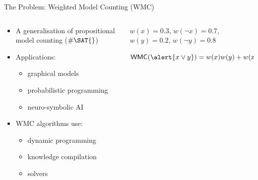 \documentclass{beamer}
\begin{document}
\begin{frame}{The Problem: Weighted Model Counting (WMC)}
  \begin{columns}
    \begin{column}{0.5\textwidth}
      \begin{itemize}
        \item A generalisation of propositional model counting ($\#\SAT{}$)
        \item Applications:
        \begin{itemize}
          \item graphical models
          \item probabilistic programming
          \item neuro-symbolic AI
        \end{itemize}
        \item WMC algorithms use:
        \begin{itemize}
          \item dynamic programming
          \item knowledge compilation
          \item \SAT{} solvers
        \end{itemize}
      \end{itemize}
    \end{column}
    \begin{column}{0.5\textwidth}
      \begin{example}
        $w(x) = 0.3$, $w(\neg x) = 0.7$, $w(y) = 0.2$, $w(\neg y) = 0.8$
        \vspace{0.5cm}

        $\mathsf{WMC}(\alert{x \lor y}) = w(x)w(y) + w(x)w(\neg y) + w(\neg x)w(y) = 0.44$
      \end{example}
    \end{column}
  \end{columns}
\end{frame}
\end{document}

